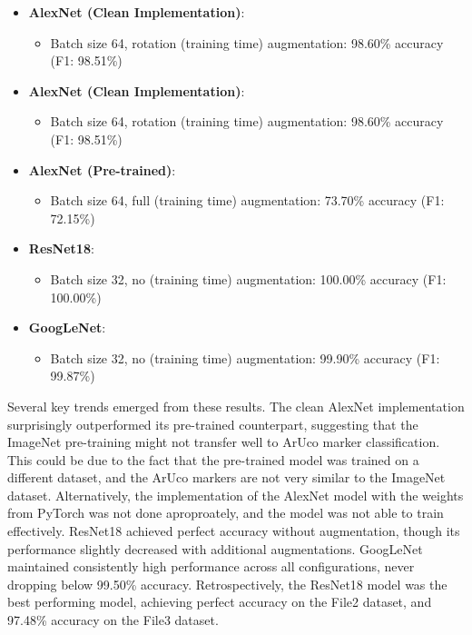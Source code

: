 \documentclass[conference]{IEEEtran}
\begin{document}
\begin{itemize}
    \item \textbf{AlexNet (Clean Implementation)}:
        \begin{itemize}
            \item Batch size 64, rotation (training time) augmentation: 98.60\% accuracy (F1: 98.51\%)
        \end{itemize}

    \item \textbf{AlexNet (Clean Implementation)}:
        \begin{itemize}
            \item Batch size 64, rotation (training time) augmentation: 98.60\% accuracy (F1: 98.51\%)
        \end{itemize}
    
    \item \textbf{AlexNet (Pre-trained)}:
        \begin{itemize}
            \item Batch size 64, full (training time) augmentation: 73.70\% accuracy (F1: 72.15\%)
        \end{itemize}
    
    \item \textbf{ResNet18}:
        \begin{itemize}
            \item Batch size 32, no (training time) augmentation: 100.00\% accuracy (F1: 100.00\%)
        \end{itemize}
    
    \item \textbf{GoogLeNet}:
        \begin{itemize}
            \item Batch size 32, no (training time) augmentation: 99.90\% accuracy (F1: 99.87\%)
        \end{itemize}
\end{itemize}

Several key trends emerged from these results. The clean AlexNet implementation surprisingly outperformed
its pre-trained counterpart, suggesting that the ImageNet pre-training might not transfer well to ArUco marker classification. This could be
due to the fact that the pre-trained model was trained on a different dataset, and the ArUco markers are not very similar to the ImageNet dataset. Alternatively,
the implementation of the AlexNet model with the weights from PyTorch was not done aproproately, and the model was not able to train effectively.
ResNet18 achieved perfect accuracy without augmentation, though its performance slightly decreased with additional augmentations.
GoogLeNet maintained consistently high performance across all configurations, never dropping below 99.50\% accuracy.
Retrospectively, the ResNet18 model was the best performing model, achieving perfect accuracy on the File2 dataset, and 97.48\% accuracy on the File3 dataset.
\end{document}
